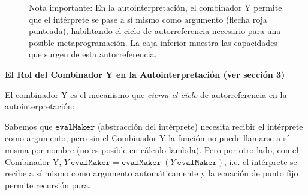 \documentclass[11pt]{article}
\begin{document}
\begin{figure}[H]
\caption{Nota importante: En la autointerpretación, el combinador Y permite que el intérprete se pase a sí mismo como argumento (flecha roja punteada), habilitando el ciclo de autorreferencia necesario para una posible metaprogramación. La caja inferior muestra las capacidades que surgen de esta autorreferencia.}
\label{fig:comparacion}
\end{figure}











\textbf{El Rol del Combinador Y en la Autointerpretación (ver secci\'on 3)}

El combinador Y es el mecanismo que \textit{cierra el ciclo} de autorreferencia en la autointerpretación:

Sabemos que $\texttt{evalMaker}$ (abstracci\'on del int\'erprete) necesita recibir el intérprete como argumento, pero sin el Combinador Y la función no puede llamarse a sí misma por nombre (no es posible en c\'alculo lambda). Pero por otro lado, con el Combinador Y, $Y\ \texttt{evalMaker} = \texttt{evalMaker}\ (Y\ \texttt{evalMaker})$, i.e. el intérprete se recibe a sí mismo como argumento automáticamente y la ecuación de punto fijo permite recursión pura.
\end{document}
